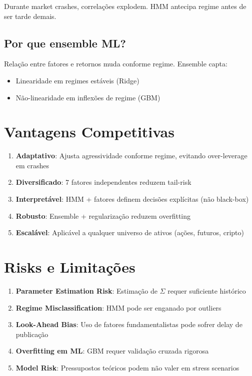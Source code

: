 \documentclass[12pt,a4paper]{article}
\begin{document}
Durante market crashes, correlações explodem. HMM antecipa regime antes de ser tarde demais.

\subsection{Por que ensemble ML?}

Relação entre fatores e retornos muda conforme regime. Ensemble capta:
\begin{itemize}
    \item Linearidade em regimes estáveis (Ridge)
    \item Não-linearidade em inflexões de regime (GBM)
\end{itemize}

\section{Vantagens Competitivas}

\begin{enumerate}
    \item \textbf{Adaptativo}: Ajusta agressividade conforme regime, evitando over-leverage em crashes
    \item \textbf{Diversificado}: 7 fatores independentes reduzem tail-risk
    \item \textbf{Interpretável}: HMM + fatores definem decisões explícitas (não black-box)
    \item \textbf{Robusto}: Ensemble + regularização reduzem overfitting
    \item \textbf{Escalável}: Aplicável a qualquer universo de ativos (ações, futuros, cripto)
\end{enumerate}

\section{Risks e Limitações}

\begin{enumerate}
    \item \textbf{Parameter Estimation Risk}: Estimação de $\Sigma$ requer suficiente histórico
    \item \textbf{Regime Misclassification}: HMM pode ser enganado por outliers
    \item \textbf{Look-Ahead Bias}: Uso de fatores fundamentalistas pode sofrer delay de publicação
    \item \textbf{Overfitting em ML}: GBM requer validação cruzada rigorosa
    \item \textbf{Model Risk}: Pressupostos teóricos podem não valer em stress scenarios
\end{enumerate}
\end{document}
